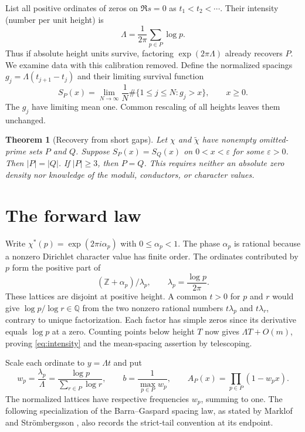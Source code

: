 \documentclass[11pt]{article}
\newtheorem{theorem}{Theorem}
\newcommand{\Z}{\mathbb Z}\newcommand{\Q}{\mathbb Q}
\begin{document}
List all positive ordinates of zeros on $\Re s=0$ as $t_1<t_2<\cdots$.
Their intensity (number per unit height) is
\begin{equation}\label{eq:intensity}
 \Lambda=\frac{1}{2\pi}\sum_{p\in P}\log p.
\end{equation}
Thus if absolute height units survive, factoring $\exp(2\pi\Lambda)$ already recovers
$P$. We examine data with this calibration removed. Define the normalized spacings
$g_j=\Lambda(t_{j+1}-t_j)$ and their limiting survival function
\begin{equation}\label{eq:surv}
 S_P(x)=\lim_{N\to\infty}\frac{1}{N}\#\{1\le j\le N:g_j>x\},\qquad x\ge0.
\end{equation}
The $g_j$ have limiting mean one. Common rescaling of all heights leaves them unchanged.

\begin{theorem}[Recovery from short gaps]\label{thm:main}
Let $\chi$ and $\widetilde\chi$ have nonempty omitted-prime sets $P$ and $Q$.
Suppose $S_P(x)=S_Q(x)$ on $0<x<\varepsilon$ for some $\varepsilon>0$.
Then $|P|=|Q|$. If $|P|\ge3$, then $P=Q$. This requires neither an absolute
zero density nor knowledge of the moduli, conductors, or character values.
\end{theorem}

\section{The forward law}
Write $\chi^*(p)=\exp(2\pi i\alpha_p)$ with $0\le\alpha_p<1$. The phase
$\alpha_p$ is rational because a nonzero Dirichlet character value has finite order.
The ordinates contributed by $p$ form the positive part of
\[
  (\Z+\alpha_p)/\lambda_p,\qquad
  \lambda_p=\frac{\log p}{2\pi}.
\]
These lattices are disjoint at positive height. A common $t>0$ for $p$ and $r$
would give $\log p/\log r\in\Q$ from the two nonzero rational numbers
$t\lambda_p$ and $t\lambda_r$, contrary to unique factorization.
Each factor has simple zeros since its derivative equals $\log p$ at a zero.
Counting points below height $T$ now gives $\Lambda T+O(m)$, proving
\eqref{eq:intensity} and the mean-spacing assertion by telescoping.

Scale each ordinate to $y=\Lambda t$ and put
\[
 w_p=\frac{\lambda_p}{\Lambda}=\frac{\log p}{\sum_{r\in P}\log r},
 \qquad b=\frac{1}{\max_{p\in P}w_p},\qquad
 A_P(x)=\prod_{p\in P}(1-w_p x).
\]
The normalized lattices have respective frequencies $w_p$, summing to one.
The following specialization of the Barra--Gaspard spacing law, as stated by
Marklof and Str\"ombergsson \cite[Theorems 4 and 5]{marklof}, also records the
strict-tail convention at its endpoint.
\end{document}
